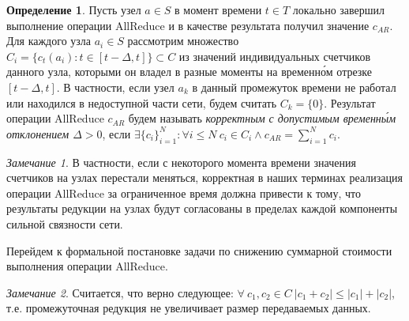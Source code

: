 \documentclass{article}
\theoremstyle{plain}
\theoremstyle{plain}
\theoremstyle{plain}
\theoremstyle{plain}
\theoremstyle{definition}
\newtheorem{definition}{Определение}[section]
\theoremstyle{remark}
\newtheorem{remark}{Замечание}[section]
\theoremstyle{plain}
\begin{document}
\begin{definition}
\label{AllReduceСorrectness}
    Пусть узел $a \in S$ в момент времени $t \in T$ локально завершил выполнение операции AllReduce и в качестве результата получил значение $c_{AR}$. Для каждого узла $a_i \in S$ рассмотрим множество $C_i = \{ c_t(a_i) \colon t \in [t - \Delta, t] \} \subset C$ из значений индивидуальных счетчиков данного узла, которыми он владел в разные моменты на временн\'{о}м отрезке $[t - \Delta, t]$. В частности, если узел $a_k$ в данный промежуток времени не работал или находился в недоступной части сети, будем считать $C_k = \{ 0 \}$. Результат операции AllReduce $c_{AR}$ будем называть \textit{корректным с допустимым временн\'{ы}м отклонением $\Delta > 0$}, если $\exists \{ c_i \}_{i = 1}^N \colon \forall i \leq N\ c_i \in C_i \wedge c_{AR} = \displaystyle \sum_{i = 1}^N c_i$.
\end{definition}

\begin{remark}
    В частности, если с некоторого момента времени значения счетчиков на узлах перестали меняться, корректная в наших терминах реализация операции AllReduce за ограниченное время должна привести к тому, что результаты редукции на узлах будут согласованы в пределах каждой компоненты сильной связности сети.
\end{remark}

Перейдем к формальной постановке задачи по снижению суммарной стоимости выполнения операции AllReduce.

\begin{remark}
\label{ReductionOptimization}
    Считается, что верно следующее: $\forall\ c_1, c_2 \in C\ |c_1 + c_2| \leq |c_1| + |c_2|$, т.е. промежуточная редукция не увеличивает размер передаваемых данных.
\end{remark}
\end{document}
